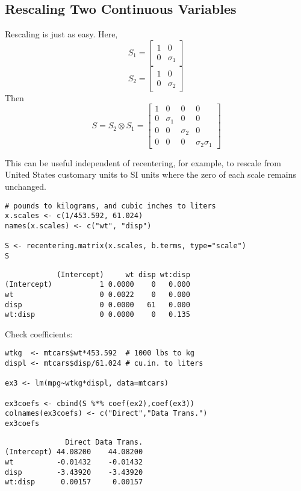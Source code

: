 \documentclass[]{article}
\begin{document}
\subsection{Rescaling Two Continuous
Variables}\label{rescaling-two-continuous-variables}

Rescaling is just as easy. Here,
\[S_1=\begin{bmatrix}1 &0 \\ 0 &\sigma_1 \end{bmatrix}\]
\[S_2=\begin{bmatrix}1 &0 \\ 0 &\sigma_2 \end{bmatrix}\] Then
\[S = S_2 \otimes S_1 = \begin{bmatrix} 1 &0 &0 &0 \\
  0 &\sigma_1 &0 &0 \\ 0 &0 &\sigma_2 &0 \\ 0 &0 &0 &\sigma_2\sigma_1 \end{bmatrix}\]

This can be useful independent of recentering, for example, to rescale
from United States customary units to SI units where the zero of each
scale remains unchanged.

\begin{verbatim}
# pounds to kilograms, and cubic inches to liters
x.scales <- c(1/453.592, 61.024)
names(x.scales) <- c("wt", "disp")
  
S <- recentering.matrix(x.scales, b.terms, type="scale")
S
\end{verbatim}

\begin{verbatim}
            (Intercept)     wt disp wt:disp
(Intercept)           1 0.0000    0   0.000
wt                    0 0.0022    0   0.000
disp                  0 0.0000   61   0.000
wt:disp               0 0.0000    0   0.135
\end{verbatim}

Check coefficients:

\begin{verbatim}
wtkg  <- mtcars$wt*453.592  # 1000 lbs to kg
displ <- mtcars$disp/61.024 # cu.in. to liters

ex3 <- lm(mpg~wtkg*displ, data=mtcars)

ex3coefs <- cbind(S %*% coef(ex2),coef(ex3))
colnames(ex3coefs) <- c("Direct","Data Trans.")
ex3coefs
\end{verbatim}

\begin{verbatim}
              Direct Data Trans.
(Intercept) 44.08200    44.08200
wt          -0.01432    -0.01432
disp        -3.43920    -3.43920
wt:disp      0.00157     0.00157
\end{verbatim}
\end{document}
